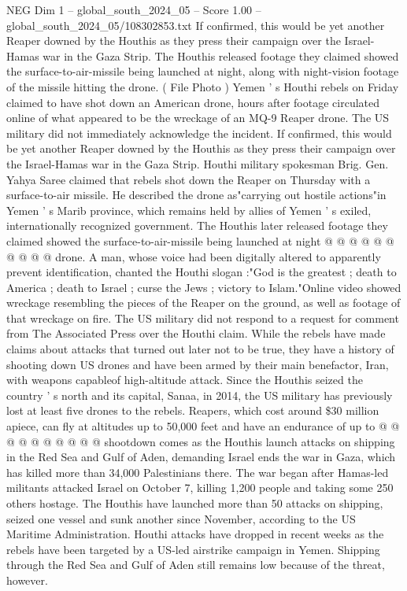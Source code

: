 \begin{textsample}{NEG Dim 1 – global\_south\_2024\_05 – Score 1.00 – global\_south\_2024\_05/108302853.txt}  \label{ex:f1_neg_377}
If confirmed, this would be yet another Reaper downed by the Houthis as they press their campaign over the Israel-Hamas war in the Gaza Strip.
The Houthis released footage they claimed showed the surface-to-air-missile being launched at night, along with night-vision footage of the missile hitting the drone. ( File Photo ) Yemen ' s Houthi rebels on Friday claimed to have shot down an American drone, hours after footage circulated online of what appeared to be the wreckage of an MQ-9 Reaper drone.
The US military did not immediately acknowledge the incident.
If confirmed, this would be yet another Reaper downed by the Houthis as they press their campaign over the Israel-Hamas war in the Gaza Strip.
Houthi military spokesman Brig.
Gen.
Yahya Saree claimed that rebels shot down the Reaper on Thursday with a surface-to-air missile.
He described the drone as"carrying out hostile actions"in Yemen ' s Marib province, which remains held by allies of Yemen ' s exiled, internationally recognized government.
The Houthis later released footage they claimed showed the surface-to-air-missile being launched at night @ @ @ @ @ @ @ @ @ @ drone.
A man, whose voice had been digitally altered to apparently prevent identification, chanted the Houthi slogan :"God is the greatest ; death to America ; death to Israel ; curse the Jews ; victory to Islam."Online video showed wreckage resembling the pieces of the Reaper on the ground, as well as footage of that wreckage on fire.
The US military did not respond to a request for comment from The Associated Press over the Houthi claim.
While the rebels have made claims about attacks that turned out later not to be true, they have a history of shooting down US drones and have been armed by their main benefactor, Iran, with weapons capableof high-altitude attack.
Since the Houthis seized the country ' s north and its capital, Sanaa, in 2014, the US military has previously lost at least five drones to the rebels.
Reapers, which cost around \$30 million apiece, can fly at altitudes up to 50,000 feet and have an endurance of up to @ @ @ @ @ @ @ @ @ @ shootdown comes as the Houthis launch attacks on shipping in the Red Sea and Gulf of Aden, demanding Israel ends the war in Gaza, which has killed more than 34,000 Palestinians there.
The war began after Hamas-led militants attacked Israel on October 7, killing 1,200 people and taking some 250 others hostage.
The Houthis have launched more than 50 attacks on shipping, seized one vessel and sunk another since November, according to the US Maritime Administration.
Houthi attacks have dropped in recent weeks as the rebels have been targeted by a US-led airstrike campaign in Yemen.
Shipping through the Red Sea and Gulf of Aden still remains low because of the threat, however.

\end{textsample}
